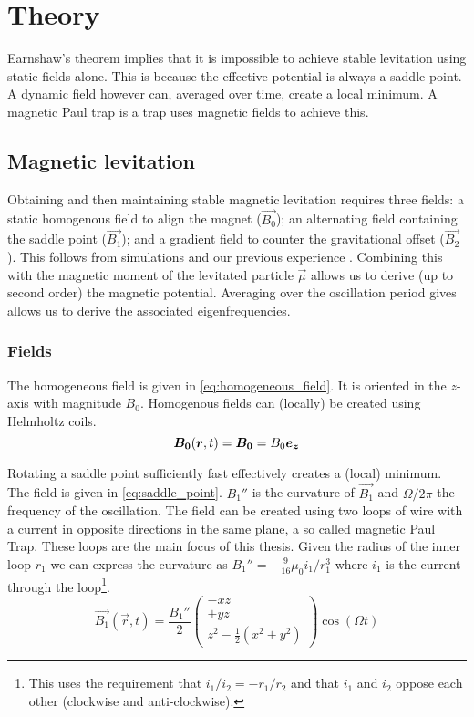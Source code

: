 \chapter{Theory}
\label{chap:theory}
Earnshaw's theorem implies that it is impossible to achieve stable levitation using static fields alone. This is because the effective potential is always a saddle point. A dynamic field however can, averaged over time, create a local minimum. A magnetic Paul trap is a trap uses magnetic fields to achieve this\cite{perdriat}.

\section{Magnetic levitation}
\label{sec:magnetic_levitation}
Obtaining and then maintaining stable magnetic levitation requires three fields: a static homogenous field to align the magnet ($\vec{B_0}$); an alternating field containing the saddle point ($\vec{B_1}$); and a gradient field to counter the gravitational offset ($\vec{B_2}$). This follows from simulations and our previous experience \cite{perdriat,mart,eli}. Combining this with the magnetic moment of the levitated particle $\vec{\mu}$ allows us to derive (up to second order) the magnetic potential. Averaging over the oscillation period gives allows us to derive the associated eigenfrequencies.

\subsection{Fields}
\label{subsec:fields}
The homogeneous field is given in \autoref{eq:homogeneous_field}. It is oriented in the $z$-axis with magnitude $B_0$. Homogenous fields can (locally) be created using Helmholtz coils.
\begin{equation}
    \bm{B_0}(\bm{r}, t) = \bm{B_0} = B_0 \bm{e_z}
    \label{eq:homogeneous_field}
\end{equation}

Rotating a saddle point sufficiently fast effectively creates a (local) minimum. The field is given in \autoref{eq:saddle_point}. $B_1''$ is the curvature of $\vec{B_1}$ and $\Omega / 2\pi$ the frequency of the oscillation. The field can be created using two loops of wire with a current in opposite directions in the same plane, a so called magnetic Paul Trap. These loops are the main focus of this thesis. Given the radius of the inner loop $r_1$ we can express the curvature as $B_1'' = -\frac{9}{16}\mu_0i_1/r_1^3$ where $i_1$ is the current through the loop\footnote{This uses the requirement that $i_1/i_2 = -r_1/r_2$ and that $i_1$ and $i_2$ oppose each other (clockwise and anti-clockwise).}.
\begin{equation}
    \vec{B_1}(\vec{r}, t) = \frac{B_1''}{2} \begin{pmatrix}
        -xz \\
        +yz \\
        z^2 - \frac{1}{2}\left(x^2 + y^2\right)
    \end{pmatrix} \cos(\Omega t)
    \label{eq:saddle_point}
\end{equation}


